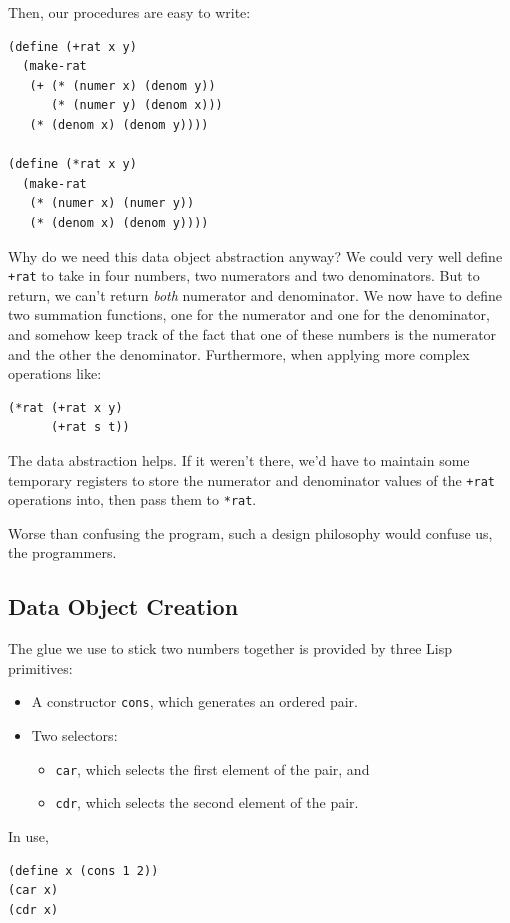 \documentclass[9pt]{report}
\begin{document}
Then, our procedures are easy to write:

\begin{verbatim}
(define (+rat x y)
  (make-rat
   (+ (* (numer x) (denom y))
      (* (numer y) (denom x)))
   (* (denom x) (denom y))))

(define (*rat x y)
  (make-rat
   (* (numer x) (numer y))
   (* (denom x) (denom y))))
\end{verbatim}

Why do we need this data object abstraction anyway? We could very
well define \texttt{+rat} to take in four numbers, two numerators and two
denominators. But to return, we can't return \emph{both} numerator and
denominator. We now have to define two summation functions, one for
the numerator and one for the denominator, and somehow keep track
of the fact that one of these numbers is the numerator and the other
the denominator. Furthermore, when applying more complex operations
like:

\begin{verbatim}
(*rat (+rat x y)
      (+rat s t))
\end{verbatim}

The data abstraction helps. If it weren't there, we'd have to
maintain some temporary registers to store the numerator and
denominator values of the \texttt{+rat} operations into, then pass them to
\texttt{*rat}.

Worse than confusing the program, such a design philosophy would
confuse us, the programmers.

\subsection{Data Object Creation}
\label{sec:org98186b5}

The glue we use to stick two numbers together is provided by three
Lisp primitives:
\begin{itemize}
\item A constructor \texttt{cons}, which generates an ordered pair.
\item Two selectors:
\begin{itemize}
\item \texttt{car}, which selects the first element of the pair, and
\item \texttt{cdr}, which selects the second element of the pair.
\end{itemize}
\end{itemize}

In use,
\begin{verbatim}
(define x (cons 1 2))
(car x)
(cdr x)
\end{verbatim}
\end{document}
